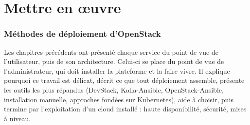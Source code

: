 
\part{Mettre en œuvre}\label{part:miseenoeuvre}

\section{Méthodes de déploiement d'OpenStack}\label{chap:deploiement}

Les chapitres précédents ont présenté chaque service du point de vue de l'utilisateur, puis de son architecture. Celui-ci se place
du point de vue de l'administrateur, qui doit installer la plateforme et la faire vivre. Il explique pourquoi ce travail est délicat,
décrit ce que tout déploiement assemble, présente les outils les plus répandus (DevStack, Kolla-Ansible, OpenStack-Ansible,
installation manuelle, approches fondées sur Kubernetes), aide à choisir, puis termine par l'exploitation d'un cloud installé :
haute disponibilité, sécurité, mises à niveau.

